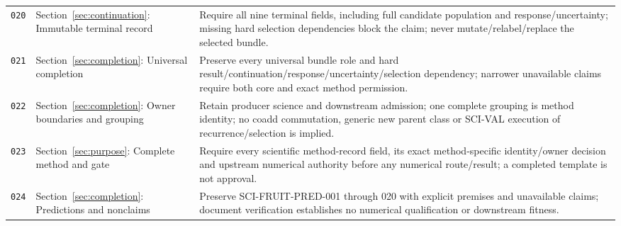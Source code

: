 {{\begin{longtable}{>{\raggedright\arraybackslash}p{.12\linewidth}>{\raggedright\arraybackslash}p{.25\linewidth}>{\raggedright\arraybackslash}p{.55\linewidth}}
\hypertarget{req-020}{}\texttt{020} & Section~\ref{sec:continuation}: Immutable terminal record & Require all nine terminal fields, including full candidate population and response/uncertainty; missing hard selection dependencies block the claim; never mutate/relabel/replace the selected bundle.\\[5pt]
\hypertarget{req-021}{}\texttt{021} & Section~\ref{sec:completion}: Universal completion & Preserve every universal bundle role and hard result/continuation/response/uncertainty/selection dependency; narrower unavailable claims require both core and exact method permission.\\[5pt]
\hypertarget{req-022}{}\texttt{022} & Section~\ref{sec:completion}: Owner boundaries and grouping & Retain producer science and downstream admission; one complete grouping is method identity; no coadd commutation, generic new parent class or SCI-VAL execution of recurrence/selection is implied.\\[5pt]
\hypertarget{req-023}{}\texttt{023} & Section~\ref{sec:purpose}: Complete method and gate & Require every scientific method-record field, its exact method-specific identity/owner decision and upstream numerical authority before any numerical route/result; a completed template is not approval.\\[5pt]
\hypertarget{req-024}{}\texttt{024} & Section~\ref{sec:completion}: Predictions and nonclaims & Preserve SCI-FRUIT-PRED-001 through 020 with explicit premises and unavailable claims; document verification establishes no numerical qualification or downstream fitness.\\[5pt]
\bottomrule\end{longtable}\normalsize{}}
}
